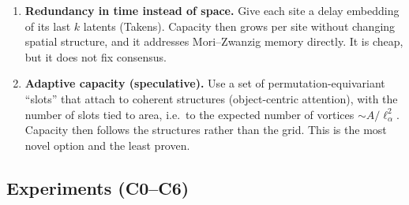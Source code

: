 \documentclass[11pt]{article}
\begin{document}
\begin{enumerate}[leftmargin=*]
  overhead. Two conditions decide whether added levels transfer:
  \begin{itemize}[leftmargin=*]
  \item Share weights across levels as well as positions, so a new level
    adds no parameters. Scale-sharing is physically justified only inside
    a self-similar cascade range. It should fail at the forcing scale and
    at the arrest scale $\ell_\alpha$, and where it fails is itself a
    measurement.
  \item Train on crops of a large domain (\S\ref{sec:crop_training}), so
    coarse levels never see wraparound. D3 broke this rule.
  \end{itemize}
\item \textbf{Redundancy in time instead of space.} Give each site a
  delay embedding of its last $k$ latents (Takens). Capacity then grows
  per site without changing spatial structure, and it addresses
  Mori--Zwanzig memory directly. It is cheap, but it does not fix
  consensus.
\item \textbf{Adaptive capacity (speculative).} Use a set of
  permutation-equivariant ``slots'' that attach to coherent structures
  (object-centric attention), with the number of slots tied to area, i.e.\
  to the expected number of vortices $\sim A/\ell_\alpha^2$. Capacity then
  follows the structures rather than the grid. This is the most novel
  option and the least proven.
\end{enumerate}

\subsection{Experiments (C0--C6)}
\label{sec:capacity_experiments}
\end{document}
